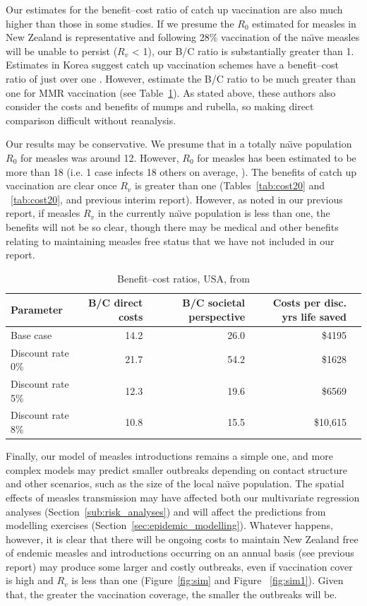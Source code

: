 \documentclass{article}
\begin{document}
\begin{itemize}
Our estimates for the benefit--cost ratio of catch up vaccination are also much higher than those in some studies. If we presume the $R_0$ estimated for measles in New Zealand is representative and following 28\% vaccination of the na\"{\i}ve measles will be unable to persist ($R_v$ < 1), our B/C ratio is substantially greater than 1. Estimates in Korea suggest catch up vaccination schemes have a benefit--cost ratio of just over one \citep{bae13}. However,  \citep{zhou4} estimate the B/C ratio to be much greater than one for MMR vaccination (see Table~\ref{table:zhou2}). As stated above, these authors also consider the costs and benefits of mumps and rubella, so making direct comparison difficult without reanalysis.

Our results may be conservative. We presume that in a totally na\"{\i}ve population $R_0$ for measles was around 12. However, $R_0$ for measles has been estimated to be more than 18 (i.e. 1 case infects 18 others on average, \citep{anderson91}). The benefits of catch up vaccination are clear once $R_v$ is greater than one (Tables~\ref{tab:cost20} and ~\ref{tab:cost20}, and previous interim report). However, as noted in our previous report, if measles $R_v$ in the currently na\"{\i}ve population is less than one, the benefits will not be so clear, though there may be medical and other benefits relating to maintaining measles free status that we have not included in our report.

\begin{table}[htdp]
\tiny
\begin{center}
\begin{tabular}{lrrrr}
\hline
Parameter & B/C direct costs & B/C societal
perspective & Costs per disc. yrs life saved\\
\hline
Base case & 14.2 & 26.0 & \$4195 \\
Discount rate 0\% & 21.7 & 54.2 & \$1628 \\
Discount rate 5\% & 12.3 & 19.6 & \$6569 \\
Discount rate 8\% & 10.8 & 15.5 & \$10,615 \\
\hline
\end{tabular}
\end{center}
\caption{Benefit--cost ratios, USA, from \citep{zhou4}}
\label{table:zhou2}
\end{table}%

Finally, our model of measles introductions remains a simple one, and more complex models may predict smaller outbreaks depending on contact structure and other scenarios, such as the size of the local na\"{\i}ve population. The spatial effects of measles transmission may have affected both our multivariate regression analyses (Section~\ref{sub:risk_analyses}) and will affect the predictions from modelling exercises (Section~\ref{sec:epidemic_modelling}). Whatever happens, however, it is clear that there will be ongoing costs to maintain New Zealand free of endemic measles and introductions occurring on an annual basis (see previous report) may produce some larger and costly outbreaks, even if vaccination cover is high and $R_v$ is less than one (Figure~\ref{fig:sim} and Figure ~\ref{fig:sim1}). Given that, the greater the vaccination coverage, the smaller the outbreaks will be.


\end{itemize}
\end{document}
